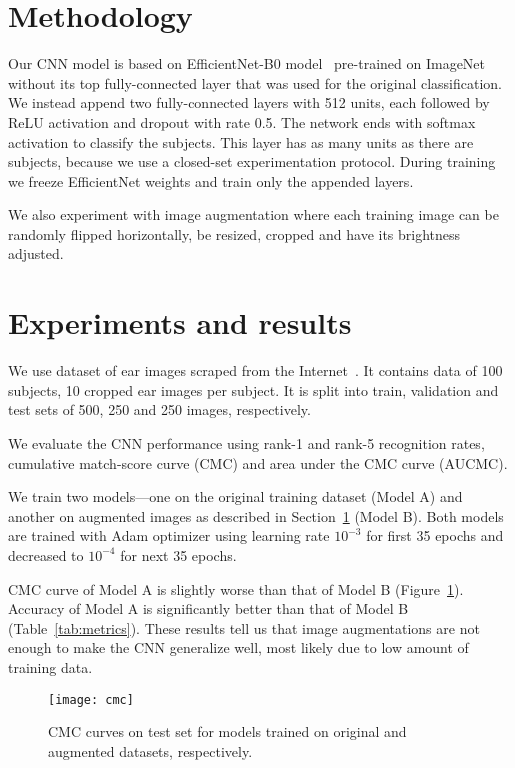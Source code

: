 \documentclass[9pt]{IEEEtran}
\begin{document}
\section{Methodology}\label{sec:meth}

Our CNN model is based on EfficientNet-B0 model~\cite{efficientNet} pre-trained on ImageNet~\cite{imageNet} without its top fully-connected layer that was used for the original classification.
We instead append two fully-connected layers with 512 units, each followed by ReLU activation and dropout with rate 0.5.
The network ends with softmax activation to classify the subjects.
This layer has as many units as there are subjects, because we use a closed-set experimentation protocol.
During training we freeze EfficientNet weights and train only the appended layers.

We also experiment with image augmentation where each training image can be randomly flipped horizontally, be resized, cropped and have its brightness adjusted.

\section{Experiments and results}

We use dataset of ear images scraped from the Internet~\cite{awe}.
It contains data of 100 subjects, 10 cropped ear images per subject.
It is split into train, validation and test sets of 500, 250 and 250 images, respectively.

We evaluate the CNN performance using rank-1 and rank-5 recognition rates, cumulative match-score curve (CMC) and area under the CMC curve (AUCMC).

We train two models---one on the original training dataset (Model A) and another on augmented images as described in Section~\ref{sec:meth} (Model B).
Both models are trained with Adam optimizer using learning rate $10^{-3}$ for first 35 epochs and decreased to $10^{-4}$ for next 35 epochs.

CMC curve of Model A is slightly worse than that of Model B (Figure~\ref{fig:cmc}).
Accuracy of Model A is significantly better than that of Model B (Table~\ref{tab:metrics}).
These results tell us that image augmentations are not enough to make the CNN generalize well, most likely due to low amount of training data.

\begin{figure}[ht]
    \centering
    \texttt{[image: cmc]}
    \caption{CMC curves on test set for models trained on original and augmented datasets, respectively.}
    \label{fig:cmc}
\end{figure}
\end{document}

